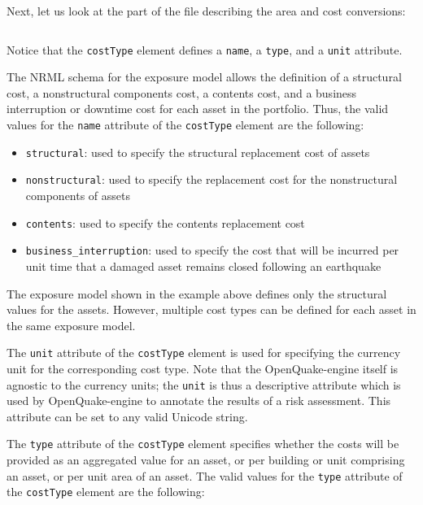 Next, let us look at the part of the file describing the area and cost
conversions:

\inputminted[firstline=10,firstnumber=10,lastline=15,fontsize=\footnotesize,frame=single,linenos,bgcolor=lightgray]{xml}{oqum/risk/Verbatim/input_exposure_minimal.xml}

Notice that the \Verb+costType+ element defines a \Verb+name+, a \Verb+type+, 
and a \Verb+unit+ attribute.

The NRML schema for the exposure model allows the definition of a structural
cost, a nonstructural components cost, a contents cost, and a business
interruption or downtime cost for each asset in the portfolio. Thus, the valid
values for the \Verb+name+ attribute of the \Verb+costType+ element are the
following:

\begin{itemize}

  \item \Verb+structural+: used to specify the structural replacement cost
    of assets

  \item \Verb+nonstructural+: used to specify the replacement cost for the
    nonstructural components of assets

  \item \Verb+contents+: used to specify the contents replacement cost

  \item \Verb+business_interruption+: used to specify the cost that will be 
    incurred per unit time that a damaged asset remains closed following an 
    earthquake

\end{itemize}

The exposure model shown in the example above defines only the structural
values for the assets. However, multiple cost types can be defined for each
asset in the same exposure model.

The \Verb+unit+ attribute of the \Verb+costType+ element is used for
specifying the currency unit for the corresponding cost type. Note that the
OpenQuake-engine itself is agnostic to the currency units; the \Verb+unit+ is
thus a descriptive attribute which is used by OpenQuake-engine to annotate the
results of a risk assessment. This attribute can be set to any valid Unicode
string.

The \Verb+type+ attribute of the \Verb+costType+ element specifies whether the
costs will be provided as an aggregated value for an asset, or per building or
unit comprising an asset, or per unit area of an asset. The valid values for
the \Verb+type+ attribute of the \Verb+costType+ element are the following:

